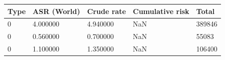 \begin{tabular}{p{1.5cm}p{2cm}p{2cm}p{2cm}p{1.5cm}}
\toprule
Type & ASR (World) & Crude rate & Cumulative risk & Total \\
\midrule
0 & 4.000000 & 4.940000 & NaN & 389846 \\
0 & 0.560000 & 0.700000 & NaN & 55083 \\
0 & 1.100000 & 1.350000 & NaN & 106400 \\
\bottomrule
\end{tabular} 